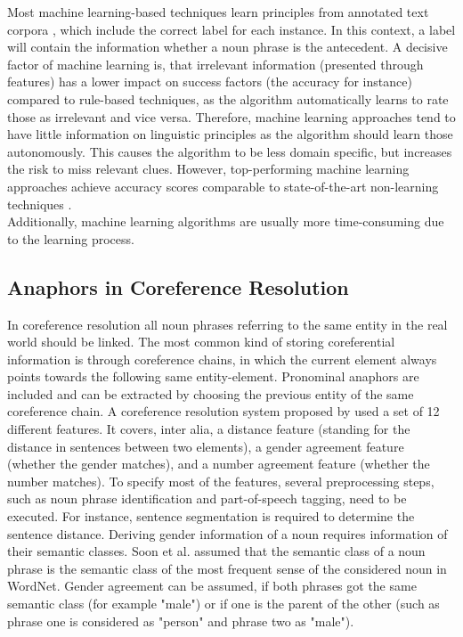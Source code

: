 Most machine learning-based techniques learn principles from annotated text corpora  \citep{soon2001machine, bergsma2005automatic}, which include the correct label for each instance. In this context, a label will contain the information whether a noun phrase is the antecedent. A decisive factor of machine learning is, that irrelevant information (presented through features) has a lower impact on success factors (the accuracy for instance) compared to rule-based techniques, as the algorithm automatically learns to rate those as irrelevant and vice versa. Therefore, machine learning approaches tend to have little information on linguistic principles as the algorithm should learn those autonomously. This causes the algorithm to be less domain specific, but increases the risk to miss relevant clues. However, top-performing machine learning approaches achieve accuracy scores comparable to state-of-the-art non-learning techniques \citep{soon2001machine}. \\
Additionally, machine learning algorithms are usually more time-consuming due to the learning process.

\subsection{Anaphors in Coreference Resolution}
\label{soon2001traininginstances}
In coreference resolution all noun phrases referring to the same entity in the real world should be linked. The most common kind of storing coreferential information is through coreference chains, in which the current element always points towards the following same entity-element. Pronominal anaphors are included and can be extracted by choosing the previous entity of the same coreference chain. 
A coreference resolution system proposed by \citep{soon2001machine} used a set of 12 different features. It covers, inter alia, a distance feature (standing for the distance in sentences between two elements), a gender agreement feature (whether the gender matches), and a number agreement feature (whether the number matches). To specify most of the features, several preprocessing steps, such as noun phrase identification and part-of-speech tagging,  need to be executed. For instance, sentence segmentation is required to determine the sentence distance. Deriving gender information of a noun requires information of their semantic classes. Soon et al. assumed that the semantic class of a noun phrase is the semantic class of the most frequent sense of the considered noun in WordNet. Gender agreement can be assumed, if both phrases got the same semantic class (for example "male") or if one is the parent of the other (such as phrase one is considered as "person" and phrase two as "male").

